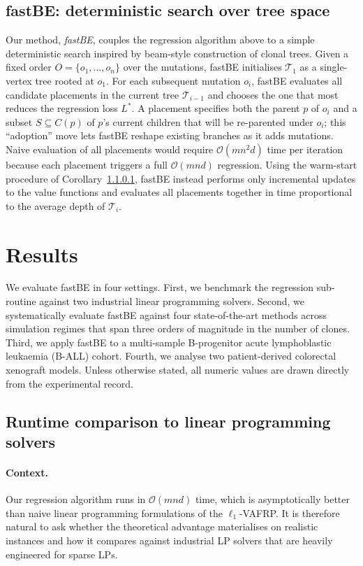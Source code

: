 \documentclass[11pt]{article}
\begin{document}
\subsection{fastBE: deterministic search over tree space}

Our method, \emph{fastBE}, couples the regression algorithm above to a simple deterministic search inspired by beam-style construction of clonal trees. Given a fixed order $O = \{o_1,\ldots,o_n\}$ over the mutations, fastBE initialises $\mathcal{T}_1$ as a single-vertex tree rooted at $o_1$. For each subsequent mutation $o_i$, fastBE evaluates all candidate placements in the current tree $\mathcal{T}_{i-1}$ and chooses the one that most reduces the regression loss $L^*$. A placement specifies both the parent $p$ of $o_i$ and a subset $S\subseteq C(p)$ of $p$'s current children that will be re-parented under $o_i$; this ``adoption'' move lets fastBE reshape existing branches as it adds mutations. Naive evaluation of all placements would require $\mathcal{O}(mn^2 d)$ time per iteration because each placement triggers a full $\mathcal{O}(mnd)$ regression. Using the warm-start procedure of Corollary~\ref{}, fastBE instead performs only incremental updates to the value functions and evaluates all placements together in time proportional to the average depth of $\mathcal{T}_i$.

\section{Results}
\label{sec:results}

We evaluate fastBE in four settings. First, we benchmark the regression sub-routine against two industrial linear programming solvers. Second, we systematically evaluate fastBE against four state-of-the-art methods across simulation regimes that span three orders of magnitude in the number of clones. Third, we apply fastBE to a multi-sample B-progenitor acute lymphoblastic leukaemia (B-ALL) cohort. Fourth, we analyse two patient-derived colorectal xenograft models. Unless otherwise stated, all numeric values are drawn directly from the experimental record.

\subsection{Runtime comparison to linear programming solvers}

\paragraph{Context.}
Our regression algorithm runs in $\mathcal{O}(mnd)$ time, which is asymptotically better than naive linear programming formulations of the $\ell_1$-VAFRP. It is therefore natural to ask whether the theoretical advantage materialises on realistic instances and how it compares against industrial LP solvers that are heavily engineered for sparse LPs.
\end{document}
